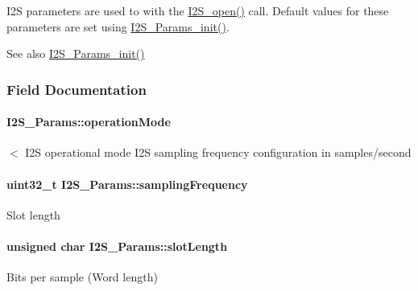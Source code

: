 I2\+S parameters are used to with the \hyperlink{_i2_s_8h_aad4ce7cbdf38dc5597f5a92ad056ebc1}{I2\+S\+\_\+open()} call. Default values for these parameters are set using \hyperlink{_i2_s_8h_a961c116273a6e8d4581278b2666f13b5}{I2\+S\+\_\+\+Params\+\_\+init()}.

\begin{DoxySeeAlso}{See also}
\hyperlink{_i2_s_8h_a961c116273a6e8d4581278b2666f13b5}{I2\+S\+\_\+\+Params\+\_\+init()} 
\end{DoxySeeAlso}


\subsubsection{Field Documentation}
\paragraph[{operation\+Mode}]{ I2\+S\+\_\+\+Params\+::operation\+Mode}\label{struct_i2_s___params_a4927bdc8e8cc29146f78f68ed2fed5f2}
$<$ I2\+S operational mode I2\+S sampling frequency configuration in samples/second 
\paragraph[{sampling\+Frequency}]{\setlength{\rightskip}{0pt plus 5cm}uint32\+\_\+t I2\+S\+\_\+\+Params\+::sampling\+Frequency}\label{struct_i2_s___params_aff5aa130ef087ebb86932182787c1df8}
Slot length 
\paragraph[{slot\+Length}]{\setlength{\rightskip}{0pt plus 5cm}unsigned char I2\+S\+\_\+\+Params\+::slot\+Length}\label{struct_i2_s___params_a82a7b2a0169d0104207814b069178029}
Bits per sample (Word length) 
